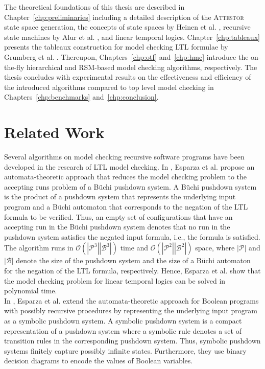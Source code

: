 \documentclass[a4paper, 12pt, twoside]{report}
\begin{document}
	The theoretical foundations of this thesis are described in Chapter~\ref{chp:preliminaries} including a detailed description of the \textsc{Attestor} state space generation, the concepts of state spaces by Heinen et al. \cite{heinen2015juggrnaut}, recursive state machines by Alur et al. \cite{alur2001analysis}, and linear temporal logics. Chapter~\ref{chp:tableaux} presents the tableaux construction for model checking LTL formulae by Grumberg et al. \cite{bhat1995efficient}. Thereupon, Chapters~\ref{chp:otf} and~\ref{chp:hmc} introduce the on-the-fly hierarchical and RSM-based model checking algorithms, respectively. The thesis concludes with experimental results on the effectiveness and efficiency of the introduced algorithms compared to top level model checking in Chapters~\ref{chp:benchmarks} and~\ref{chp:conclusion}. 

	\section{Related Work}
	Several algorithms on model checking recursive software programs have been developed in the research of LTL model checking. In \cite{esparza2000}, Esparza et al. propose an automata-theoretic approach that reduces the model checking problem to the accepting runs problem of a Büchi pushdown system. A Büchi pushdown system is the product of a pushdown system that represents the underlying input program and a Büchi automaton that corresponds to the negation of the LTL formula to be verified. Thus, an empty set of configurations that have an accepting run in the Büchi pushdown system denotes that no run in the pushdown system satisfies the negated input formula, i.e., the formula is satisfied. The algorithm runs in $\mathcal{O}(|\mathcal{P}^3||\mathcal{B}^3|)$ time and $\mathcal{O}(|\mathcal{P}^2||\mathcal{B}^2|)$ space, where $|\mathcal{P}|$ and $|\mathcal{B}|$ denote the size of the pushdown system and the size of a Büchi automaton for the negation of the LTL formula, respectively. Hence, Esparza et al. show that the model checking problem for linear temporal logics can be solved in polynomial time.\\
	
	In \cite{schwoon2001}, Esparza et al. extend the automata-theoretic approach for Boolean programs with possibly recursive procedures by representing the underlying input program as a symbolic pushdown system. A symbolic pushdown system is a compact representation of a pushdown system where a symbolic rule denotes a set of transition rules in the corresponding pushdown system. Thus, symbolic pushdown systems finitely capture possibly infinite states. Furthermore, they use binary decision diagrams to encode the values of Boolean variables.\\
	
\end{document}
